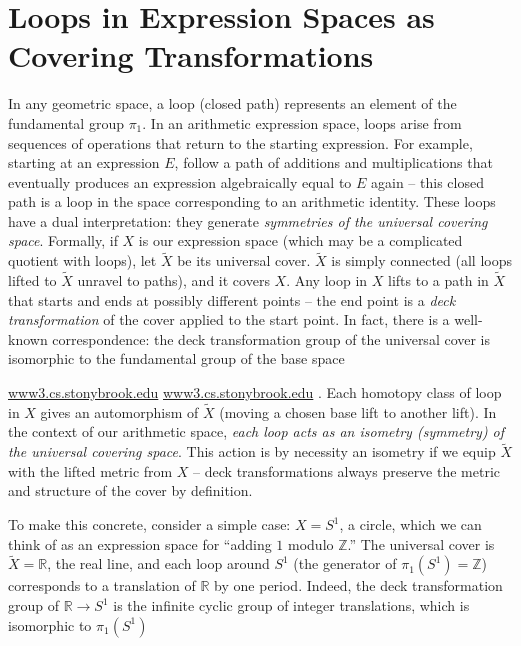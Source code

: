\documentclass[11pt]{article}
\theoremstyle{remark}
\begin{document}
\section*{Loops in Expression Spaces as Covering Transformations}
In any geometric space, a loop (closed path) represents an element of the fundamental group $\pi_1$. In an arithmetic expression space, loops arise from sequences of operations that return to the starting expression. For example, starting at an expression $E$, follow a path of additions and multiplications that eventually produces an expression algebraically equal to $E$ again – this closed path is a loop in the space corresponding to an arithmetic identity. These loops have a dual interpretation: they generate \textit{symmetries of the universal covering space}. Formally, if $X$ is our expression space (which may be a complicated quotient with loops), let $\widetilde{X}$ be its universal cover. $\widetilde{X}$ is simply connected (all loops lifted to $\widetilde{X}$ unravel to paths), and it covers $X$. Any loop in $X$ lifts to a path in $\widetilde{X}$ that starts and ends at possibly different points – the end point is a \textit{deck transformation} of the cover applied to the start point. In fact, there is a well-known correspondence: the deck transformation group of the universal cover is isomorphic to the fundamental group of the base space

\href{https://www3.cs.stonybrook.edu/~gu/lectures/2022/Lecture_1/2022_Summer_CCG_Lecture_1.pdf#:~:text=Definition%20,3%2C%202022%2044%20%2F%2059}{www3.cs.stonybrook.edu}
\href{https://www3.cs.stonybrook.edu/~gu/lectures/2022/Lecture_1/2022_Summer_CCG_Lecture_1.pdf#:~:text=The%20quotient%20group%20of%20%CF%801,deck%20transformation%20group%20of%20S%CB%9C}{www3.cs.stonybrook.edu}
. Each homotopy class of loop in $X$ gives an automorphism of $\widetilde{X}$ (moving a chosen base lift to another lift). In the context of our arithmetic space, \textit{each loop acts as an isometry (symmetry) of the universal covering space}. This action is by necessity an isometry if we equip $\widetilde{X}$ with the lifted metric from $X$ – deck transformations always preserve the metric and structure of the cover by definition.

To make this concrete, consider a simple case: $X = S^1$, a circle, which we can think of as an expression space for “adding $1$ modulo $\mathbb{Z}$.” The universal cover is $\widetilde{X} = \mathbb{R}$, the real line, and each loop around $S^1$ (the generator of $\pi_1(S^1)=\mathbb{Z}$) corresponds to a translation of $\mathbb{R}$ by one period. Indeed, the deck transformation group of $\mathbb{R}\to S^1$ is the infinite cyclic group of integer translations, which is isomorphic to $\pi_1(S^1)$
\end{document}
